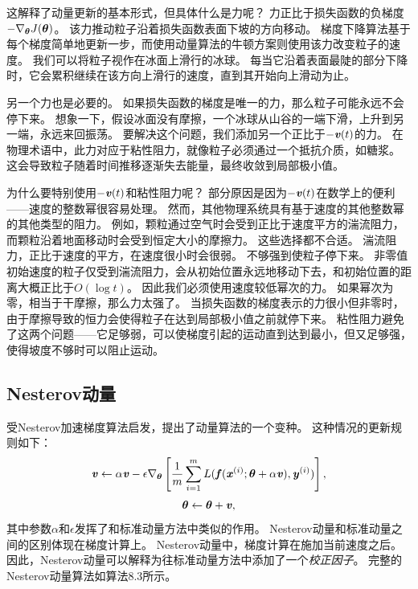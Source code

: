 这解释了动量更新的基本形式，但具体什么是力呢？
力正比于损失函数的负梯度$-\nabla_{\boldsymbol{\theta}} J(\boldsymbol{\theta})$。
该力推动粒子沿着损失函数表面下坡的方向移动。
梯度下降算法基于每个梯度简单地更新一步，而使用动量算法的牛顿方案则使用该力改变粒子的速度。
我们可以将粒子视作在冰面上滑行的冰球。
每当它沿着表面最陡的部分下降时，它会累积继续在该方向上滑行的速度，直到其开始向上滑动为止。


另一个力也是必要的。
如果损失函数的梯度是唯一的力，那么粒子可能永远不会停下来。
想象一下，假设冰面没有摩擦，一个冰球从山谷的一端下滑，上升到另一端，永远来回振荡。
要解决这个问题，我们添加另一个正比于$-\boldsymbol{\mathit{v}}(t)$的力。
在物理术语中，此力对应于粘性阻力，就像粒子必须通过一个抵抗介质，如糖浆。
这会导致粒子随着时间推移逐渐失去能量，最终收敛到局部极小值。

为什么要特别使用$-\boldsymbol{\mathit{v}}(t)$和粘性阻力呢？
部分原因是因为$-\boldsymbol{\mathit{v}}(t)$在数学上的便利——速度的整数幂很容易处理。
然而，其他物理系统具有基于速度的其他整数幂的其他类型的阻力。
例如，颗粒通过空气时会受到正比于速度平方的湍流阻力，而颗粒沿着地面移动时会受到恒定大小的摩擦力。
这些选择都不合适。
湍流阻力，正比于速度的平方，在速度很小时会很弱。
不够强到使粒子停下来。
非零值初始速度的粒子仅受到湍流阻力，会从初始位置永远地移动下去，和初始位置的距离大概正比于$O(\log t)$。
因此我们必须使用速度较低幂次的力。
如果幂次为零，相当于干摩擦，那么力太强了。
当损失函数的梯度表示的力很小但非零时，由于摩擦导致的恒力会使得粒子在达到局部极小值之前就停下来。
粘性阻力避免了这两个问题——它足够弱，可以使梯度引起的运动直到达到最小，但又足够强，使得坡度不够时可以阻止运动。

\subsection{Nesterov动量}
\label{sec:nesterov_momentum}
受Nesterov加速梯度算法\citep{Nesterov83b,Nesterov03}启发，\cite{sutskeverimportance}提出了动量算法的一个变种。
这种情况的更新规则如下：
\begin{equation}
    \boldsymbol{\mathit{v}} \leftarrow \alpha\boldsymbol{\mathit{v}} - \epsilon \nabla_{\boldsymbol{\theta}} \left[
    \frac{1}{m} \sum_{i=1}^m L( \boldsymbol{\mathit{f}}(\boldsymbol{\mathit{x}}^{(i)}; \boldsymbol{\theta} + \alpha \boldsymbol{\mathit{v}}), \boldsymbol{\mathit{y}}^{(i)} )
 \right],
\end{equation}
\begin{equation}
    \boldsymbol{\theta} \leftarrow \boldsymbol{\theta} + \boldsymbol{\mathit{v}} ,
\end{equation}
其中参数$\alpha$和$\epsilon$发挥了和标准动量方法中类似的作用。 
Nesterov动量和标准动量之间的区别体现在梯度计算上。
Nesterov动量中，梯度计算在施加当前速度之后。
因此，Nesterov动量可以解释为往标准动量方法中添加了一个\emph{校正因子}。
完整的Nesterov动量算法如算法8.3所示。

